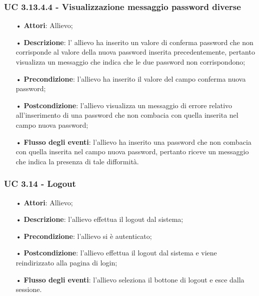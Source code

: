 \subsubsection{UC 3.13.4.4 - Visualizzazione messaggio password diverse}
\begin{itemize}
	\item[•]\textbf{Attori}: Allievo;
	\item[•]\textbf{Descrizione}: l' allievo ha inserito un valore di conferma password che non corrisponde al valore della nuova password inserita precedentemente, pertanto visualizza un messaggio che indica che le due password non corrispondono;
	\item[•]\textbf{Precondizione}: l'allievo ha inserito il valore del campo conferma nuova password;
	\item[•]\textbf{Postcondizione}: l'allievo visualizza un messaggio di errore relativo all'inserimento di una password che non combacia con quella inserita nel campo nuova password; 
	\item[•]\textbf{Flusso degli eventi}: l'allievo ha inserito una password che non combacia con quella inserita nel campo nuova password, pertanto riceve un messaggio che indica la presenza di tale difformità.
\end{itemize}

\subsubsection{UC 3.14 - Logout}
\begin{itemize}
    \item[•] \textbf{Attori}: Allievo;
    \item[•] \textbf{Descrizione}: l'allievo effettua il logout dal sistema;
    \item[•] \textbf{Precondizione}: l'allievo si è autenticato;
    \item[•] \textbf{Postcondizione}: l'allievo effettua il logout dal sistema e viene reindirizzato alla pagina di login;
    \item[•] \textbf{Flusso degli eventi}: l'allievo seleziona il bottone di logout e esce dalla sessione.
\end{itemize}